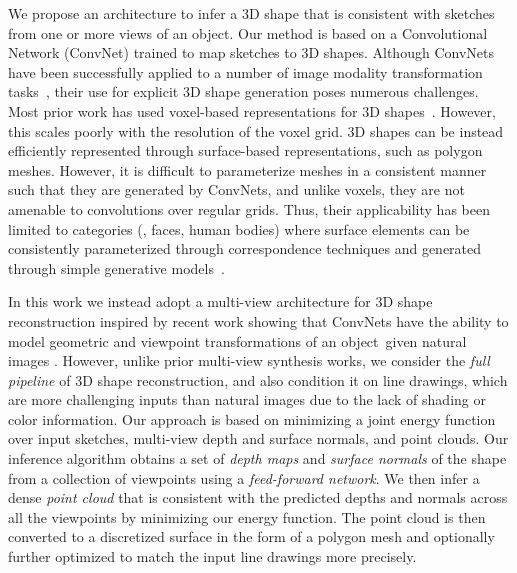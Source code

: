 \documentclass[10pt, conference, compsocconf]{IEEEtran}
\begin{document}
We propose an architecture to infer a 3D shape that is consistent with sketches from one or more views of an object. %
Our method is based on a Convolutional Network (ConvNet) trained to map sketches to 3D shapes. Although ConvNets have been successfully applied to a number of  image modality transformation tasks~\cite{larsson2016learning,zhang2016colorful, johnson2016perceptual,ulyanov2016texture,pix2pix2016}, their use for explicit 3D shape generation poses numerous challenges. Most prior work has used voxel-based representations for 3D shapes~\cite{wu2016learning,choy20163d,yan2016perspective}. 
However, this scales poorly with the resolution of the voxel grid. 3D shapes can be instead efficiently represented through surface-based representations, such as  polygon meshes. However, it is difficult to parameterize meshes in a consistent manner such that they are generated by ConvNets, and unlike voxels, they are not amenable to convolutions over regular grids.
Thus, their applicability has been limited to categories (\eg, faces, human bodies) where
surface elements
can be consistently parameterized
through correspondence techniques and generated through simple generative models~\cite{allen2003space,blanz1999morphable,cashman2013shape,Huang:2015:deeplearningsurfaces}.

In this work we instead adopt a multi-view architecture for 3D shape reconstruction inspired by recent work showing that ConvNets have the ability to model geometric and viewpoint transformations of an object~given natural images \cite{dosovitskiy2015learning, tatarchenko2015single,tatarchenko2016multi,yang2015weakly,zhou2016view}.
However, unlike prior multi-view  synthesis works, we consider the \emph{full pipeline} of 3D shape reconstruction, and also condition it on 
line drawings, which are  more challenging inputs than natural images due to the lack of shading or color information. Our approach is based on minimizing a joint energy function over input sketches, multi-view depth and surface normals, and point clouds. Our inference algorithm obtains a   set of \emph{depth maps} and \emph{surface normals} of the shape from a collection of viewpoints using a \emph{feed-forward network}. We then infer a dense \emph{point cloud} that is consistent with the predicted depths and normals across all the viewpoints by minimizing our energy function. The point cloud is then converted to a discretized surface in the form of a polygon mesh and optionally further optimized to match the input line drawings more precisely.
\end{document}

